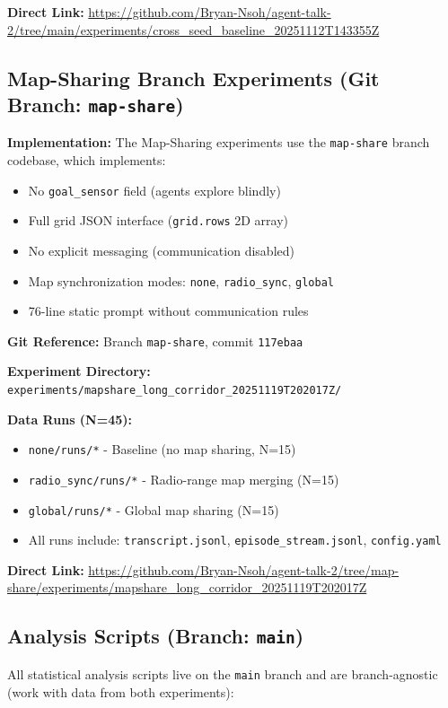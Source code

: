 \documentclass[11pt]{article}
\begin{document}
\textbf{Direct Link:} \url{https://github.com/Bryan-Nsoh/agent-talk-2/tree/main/experiments/cross_seed_baseline_20251112T143355Z}

\subsection{Map-Sharing Branch Experiments (Git Branch: \texttt{map-share})}

\textbf{Implementation:} The Map-Sharing experiments use the \texttt{map-share} branch codebase, which implements:
\begin{itemize}
    \item No \texttt{goal\_sensor} field (agents explore blindly)
    \item Full grid JSON interface (\texttt{grid.rows} 2D array)
    \item No explicit messaging (communication disabled)
    \item Map synchronization modes: \texttt{none}, \texttt{radio\_sync}, \texttt{global}
    \item 76-line static prompt without communication rules
\end{itemize}

\textbf{Git Reference:} Branch \texttt{map-share}, commit \texttt{117ebaa}

\textbf{Experiment Directory:} \texttt{experiments/mapshare\_long\_corridor\_20251119T202017Z/}

\textbf{Data Runs (N=45):}
\begin{itemize}
    \item \texttt{none/runs/*} - Baseline (no map sharing, N=15)
    \item \texttt{radio\_sync/runs/*} - Radio-range map merging (N=15)
    \item \texttt{global/runs/*} - Global map sharing (N=15)
    \item All runs include: \texttt{transcript.jsonl}, \texttt{episode\_stream.jsonl}, \texttt{config.yaml}
\end{itemize}

\textbf{Direct Link:} \url{https://github.com/Bryan-Nsoh/agent-talk-2/tree/map-share/experiments/mapshare_long_corridor_20251119T202017Z}

\subsection{Analysis Scripts (Branch: \texttt{main})}

All statistical analysis scripts live on the \texttt{main} branch and are branch-agnostic (work with data from both experiments):
\end{document}
